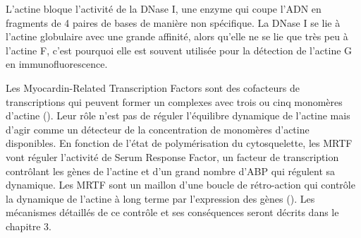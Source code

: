 \documentclass{report}
\begin{document}
L'actine bloque l'activité de la DNase I, une enzyme qui coupe l'ADN en fragments de 4 paires de bases de manière non spécifique. La DNase I se lie à l'actine globulaire avec une grande affinité, alors qu'elle ne se lie que très peu à l'actine F, c'est pourquoi elle est souvent utilisée pour la détection de l'actine G en immunofluorescence. 

Les Myocardin-Related Transcription Factors sont des cofacteurs de transcriptions qui peuvent former un complexes avec trois ou cinq monomères d'actine (\cite{mouilleron_molecular_2008}). Leur rôle n'est pas de réguler l'équilibre dynamique de l'actine mais d'agir comme un détecteur de la concentration de monomères d'actine disponibles. 
En fonction de l'état de polymérisation du cytosquelette, les MRTF vont réguler l'activité de Serum Response Factor, un facteur de transcription contrôlant les gènes de l'actine et d'un grand nombre d'ABP qui régulent sa dynamique. 
Les MRTF sont un maillon d'une boucle de rétro-action qui contrôle la dynamique de l'actine à long terme par l'expression des gènes (\cite{salvany_core_2014}). 
Les mécanismes détaillés de ce contrôle et ses conséquences seront décrits dans le chapitre 3. 
\end{document}
